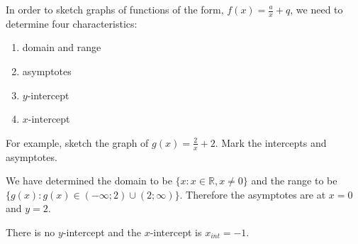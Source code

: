         \label{m39341*uid157}
            \nopagebreak
            
          
          \label{m39341*id248894}In order to sketch graphs of functions of the form, \begin{math}f\left(x\right)=\frac{a}{x}+q\end{math}, we need to determine four characteristics:\par 
          \label{m39341*id248931}\begin{enumerate}[noitemsep, label=\textbf{\arabic*}. ] 
            \label{m39341*uid158}\item domain and range
\label{m39341*uid159}\item asymptotes
\label{m39341*uid160}\item \begin{math}y\end{math}-intercept
\label{m39341*uid161}\item \begin{math}x\end{math}-intercept
\end{enumerate}
        
          \label{m39341*id248998}For example, sketch the graph of \begin{math}g\left(x\right)=\frac{2}{x}+2\end{math}. Mark the intercepts and asymptotes.\par 
          \label{m39341*id249035}We have determined the domain to be \begin{math}\{x:x\in \mathbb{R},x\ne 0\}\end{math} and the range to be \begin{math}\{g\left(x\right):g\left(x\right)\in \left(-\infty ;2\right)\cup \left(2;\infty \right)\}\end{math}. Therefore the asymptotes are at \begin{math}x=0\end{math} and \begin{math}y=2\end{math}.\par 
          \label{m39341*id249164}There is no \begin{math}y\end{math}-intercept and the \begin{math}x\end{math}-intercept is \begin{math}{x}_{int}=-1\end{math}.\par 
          
